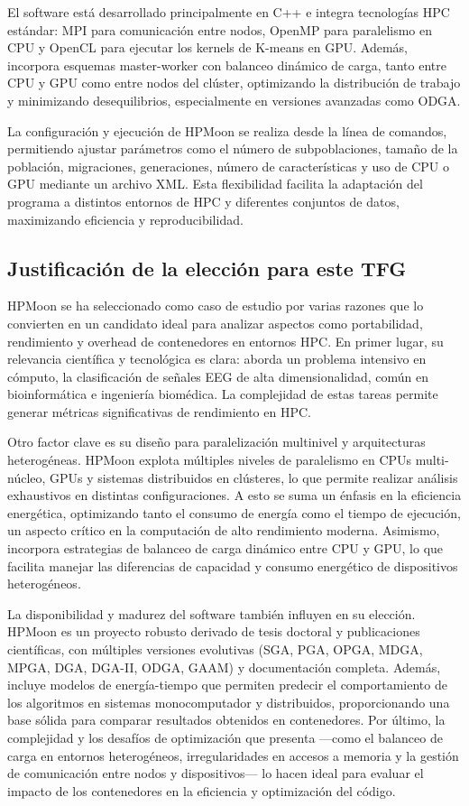 El software está desarrollado principalmente en C++ e integra tecnologías HPC estándar: MPI para comunicación entre nodos, OpenMP para paralelismo en CPU y OpenCL para ejecutar los kernels de K-means en GPU. Además, incorpora esquemas master-worker con balanceo dinámico de carga, tanto entre CPU y GPU como entre nodos del clúster, optimizando la distribución de trabajo y minimizando desequilibrios, especialmente en versiones avanzadas como ODGA.

La configuración y ejecución de HPMoon se realiza desde la línea de comandos, permitiendo ajustar parámetros como el número de subpoblaciones, tamaño de la población, migraciones, generaciones, número de características y uso de CPU o GPU mediante un archivo XML. Esta flexibilidad facilita la adaptación del programa a distintos entornos de HPC y diferentes conjuntos de datos, maximizando eficiencia y reproducibilidad.

\subsection{Justificación de la elección para este TFG}\label{subsec:hpm_justificacion}

HPMoon se ha seleccionado como caso de estudio por varias razones que lo convierten en un candidato ideal para analizar aspectos como portabilidad, rendimiento y overhead de contenedores en entornos HPC. En primer lugar, su relevancia científica y tecnológica es clara: aborda un problema intensivo en cómputo, la clasificación de señales EEG de alta dimensionalidad, común en bioinformática e ingeniería biomédica. La complejidad de estas tareas permite generar métricas significativas de rendimiento en HPC.

Otro factor clave es su diseño para paralelización multinivel y arquitecturas heterogéneas. HPMoon explota múltiples niveles de paralelismo en CPUs multi-núcleo, GPUs y sistemas distribuidos en clústeres, lo que permite realizar análisis exhaustivos en distintas configuraciones. A esto se suma un énfasis en la eficiencia energética, optimizando tanto el consumo de energía como el tiempo de ejecución, un aspecto crítico en la computación de alto rendimiento moderna. Asimismo, incorpora estrategias de balanceo de carga dinámico entre CPU y GPU, lo que facilita manejar las diferencias de capacidad y consumo energético de dispositivos heterogéneos.

La disponibilidad y madurez del software también influyen en su elección. HPMoon es un proyecto robusto derivado de tesis doctoral y publicaciones científicas, con múltiples versiones evolutivas (SGA, PGA, OPGA, MDGA, MPGA, DGA, DGA-II, ODGA, GAAM) y documentación completa. Además, incluye modelos de energía-tiempo que permiten predecir el comportamiento de los algoritmos en sistemas monocomputador y distribuidos, proporcionando una base sólida para comparar resultados obtenidos en contenedores. Por último, la complejidad y los desafíos de optimización que presenta —como el balanceo de carga en entornos heterogéneos, irregularidades en accesos a memoria y la gestión de comunicación entre nodos y dispositivos— lo hacen ideal para evaluar el impacto de los contenedores en la eficiencia y optimización del código.

